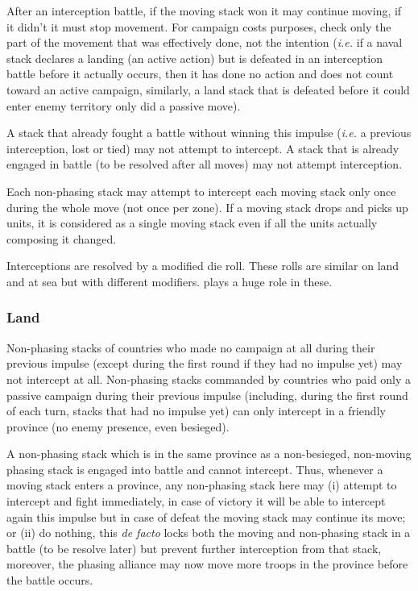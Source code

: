 After an interception battle, if the moving stack won it may continue moving,
if it didn't it must stop movement. For campaign costs purposes, check only
the part of the movement that was effectively done, not the intention
(\emph{i.e.}  if a naval stack declares a landing (an active action) but is
defeated in an interception battle before it actually occurs, then it has done
no action and does not count toward an active campaign, similarly, a land
stack that is defeated before it could enter enemy territory only did a
passive move).

A stack that already fought a battle without winning this impulse (\emph{i.e.}
a previous interception, lost or tied) may not attempt to intercept. A stack
that is already engaged in battle (to be resolved after all moves) may not
attempt interception.

Each non-phasing stack may attempt to intercept each moving stack only once
during the whole move (not once per zone). If a moving stack drops and picks
up units, it is considered as a single moving stack even if all the units
actually composing it changed.

Interceptions are resolved by a modified die roll. These rolls are similar on
land and at sea but with different modifiers. \Man plays a huge role in these.

\subsubsection{Land}
Non-phasing stacks of countries who made no campaign at all during their
previous impulse (except during the first round if they had no impulse yet)
may not intercept at all. Non-phasing stacks commanded by countries who paid
only a passive campaign during their previous impulse (including, during the
first round of each turn, stacks that had no impulse yet) can only intercept
in a friendly province (no enemy presence, even besieged).

A non-phasing stack which is in the same province as a non-besieged,
non-moving phasing stack is engaged into battle and cannot intercept. Thus,
whenever a moving stack enters a province, any non-phasing stack here may (i)
attempt to intercept and fight immediately, in case of victory it will be able
to intercept again this impulse but in case of defeat the moving stack may
continue its move; or (ii) do nothing, this \emph{de facto} locks both the
moving and non-phasing stack in a battle (to be resolve later) but prevent
further interception from that stack, moreover, the phasing alliance may now
move more troops in the province before the battle occurs.

